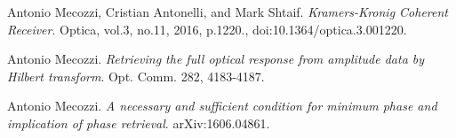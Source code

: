 \begin{thebibliography}{9}
	Antonio Mecozzi, Cristian Antonelli, and Mark Shtaif.
	\textit{Kramers-Kronig Coherent Receiver}.
	Optica, vol.3, no.11, 2016, p.1220., doi:10.1364/optica.3.001220.
	
	Antonio Mecozzi.
	\textit{Retrieving the full optical response from amplitude data by Hilbert transform}. Opt. Comm. 282, 4183-4187.
	
	Antonio Mecozzi.
	\textit{A necessary and sufficient condition for minimum phase and implication of phase retrieval}. arXiv:1606.04861.
\end{thebibliography}


